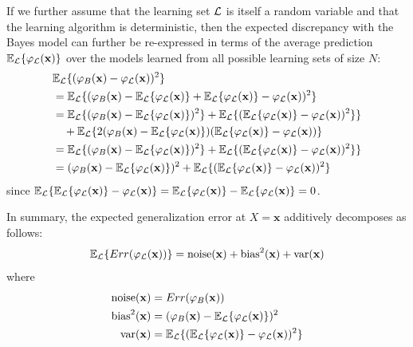 If we further assume that the learning set ${\cal L}$ is itself a random
variable and that the learning algorithm is deterministic, then the expected
discrepancy with the Bayes model can further be re-expressed in terms of the
average prediction $\mathbb{E}_{\cal L} \{ \varphi_{\cal L}(\mathbf{x}) \}$
over the models learned from all possible learning sets of size $N$:
\begin{align}
& \mathbb{E}_{\cal L} \{ (\varphi_B(\mathbf{x}) - \varphi_{\cal L}(\mathbf{x}))^2 \}\nonumber \\
&= \mathbb{E}_{\cal L} \{ (\varphi_B(\mathbf{x}) - \mathbb{E}_{\cal L} \{ \varphi_{\cal L}(\mathbf{x}) \} + \mathbb{E}_{\cal L} \{ \varphi_{\cal L}(\mathbf{x}) \} - \varphi_{\cal L}(\mathbf{x}))^2 \} \nonumber \\
&= \mathbb{E}_{\cal L} \{ (\varphi_B(\mathbf{x}) - \mathbb{E}_{\cal L} \{ \varphi_{\cal L}(\mathbf{x}) \} )^2 \} + \mathbb{E}_{\cal L} \{ (\mathbb{E}_{\cal L} \{ \varphi_{\cal L}(\mathbf{x}) \} - \varphi_{\cal L}(\mathbf{x}))^2 \} \}\nonumber \\
& \quad+ \mathbb{E}_{\cal L} \{ 2(\varphi_B(\mathbf{x}) - \mathbb{E}_{\cal L} \{ \varphi_{\cal L}(\mathbf{x}) \})(\mathbb{E}_{\cal L} \{ \varphi_{\cal L}(\mathbf{x}) \} - \varphi_{\cal L}(\mathbf{x}))\} \nonumber \\
&= \mathbb{E}_{\cal L} \{ (\varphi_B(\mathbf{x}) - \mathbb{E}_{\cal L} \{ \varphi_{\cal L}(\mathbf{x}) \} )^2 \} + \mathbb{E}_{\cal L} \{ (\mathbb{E}_{\cal L} \{ \varphi_{\cal L}(\mathbf{x}) \} - \varphi_{\cal L}(\mathbf{x}))^2 \} \}\nonumber \\
&= (\varphi_B(\mathbf{x}) - \mathbb{E}_{\cal L} \{ \varphi_{\cal L}(\mathbf{x}) \} )^2 + \mathbb{E}_{\cal L} \{ (\mathbb{E}_{\cal L} \{ \varphi_{\cal L}(\mathbf{x}) \} - \varphi_{\cal L}(\mathbf{x}))^2 \}
\end{align}
since $\mathbb{E}_{\cal L}\{ \mathbb{E}_{\cal L} \{ \varphi_{\cal
L}(\mathbf{x}) \} - \varphi_{\cal L}(\mathbf{x}) \} =  \mathbb{E}_{\cal L} \{
\varphi_{\cal L}(\mathbf{x}) \} -  \mathbb{E}_{\cal L} \{ \varphi_{\cal
L}(\mathbf{x}) \} = 0$.

In summary, the expected generalization error at $X=\mathbf{x}$ additively
decomposes as follows:
\begin{equation}
\mathbb{E}_{\cal L} \{ Err(\varphi_{\cal L}(\mathbf{x})) \} = \text{noise}(\mathbf{x}) + \text{bias}^2(\mathbf{x}) + \text{var}(\mathbf{x})
\end{equation}
where
\begin{align}
\text{noise}(\mathbf{x}) &= Err(\varphi_B(\mathbf{x})) \\
\text{bias}^2(\mathbf{x}) &= (\varphi_B(\mathbf{x}) - \mathbb{E}_{\cal L} \{ \varphi_{\cal L}(\mathbf{x}) \} )^2 \\
\text{var}(\mathbf{x}) &= \mathbb{E}_{\cal L} \{ (\mathbb{E}_{\cal L} \{ \varphi_{\cal L}(\mathbf{x}) \} - \varphi_{\cal L}(\mathbf{x}))^2 \}
\end{align}

